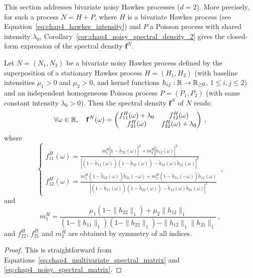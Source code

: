       This section addresses bivariate noisy Hawkes processes ($d=2$).
      More precisely, for such a process $N = H + P$, where $H$ is a bivariate Hawkes process (see Equation~\eqref{eq:chap4_hawkes_intensity}) and $P$ a Poisson process with shared intensity $\lambda_0$,
      Corollary~\ref{cor:chap4_noisy_spectral_density_2} gives the closed-form expression of the spectral density $\mathbf f^N$.
      \begin{corollary}\label{cor:chap4_noisy_spectral_density_2}
        Let $N = (N_1, N_2)$ be a bivariate noisy Hawkes process defined by the superposition of a stationary Hawkes process $H = (H_1, H_2)$
        (with baseline intensities $\mu_1 > 0$ and $\mu_2 > 0$, and kernel functions $h_{ij} : {\mathbb R} \to {\mathbb R}_{\geq 0}$, $1 \le i, j \le 2$)
        and an independent homogeneous Poisson process $P = (P_1, P_2)$ (with same constant intensity $\lambda_0 > 0$).
        Then the spectral density $\mathbf f^N$ of $N$ reads:
        \begin{equation*}
          \forall \omega \in {\mathbb R}, \quad
          \mathbf f^N(\omega) =
          \begin{pmatrix}
            f_{11}^H(\omega) + \lambda_0 & f_{12}^H(\omega) \\
            f_{21}^H(\omega) & f_{22}^H(\omega) + \lambda_0
          \end{pmatrix} \,,
        \end{equation*}
        where
        \[
          \begin{cases}
            f_{11}^H (\omega) = \frac{m_1^H \left \lvert 1 - \tilde h_{22}(\omega) \right \rvert^2 + m_2^H \left \lvert  \tilde h_{12}(\omega) \right \rvert^2}{\left \lvert \left (1-\tilde h_{11}(\omega) \right) \left (1-\tilde h_{22}(\omega) \right) - \tilde h_{12}(\omega) \tilde h_{21}(\omega) \right \rvert^2}\\
            f_{12}^H(\omega) = \frac{m_1^H \left(1-\tilde h_{22}(\omega) \right)\tilde h_{21}(-\omega) + m_2^H \left (1-\tilde h_{11}(-\omega) \right) \tilde h_{12}(\omega)}{\left \lvert \left (1-\tilde h_{11}(\omega) \right) \left (1-\tilde h_{22}(\omega) \right) - \tilde h_{12}(\omega) \tilde h_{21}(\omega) \right \rvert^2}
          \end{cases} \,,
        \]
        and
        \[
          m_1^H = \frac{\mu_1\left( 1 - \|h_{22}\|_1 \right)  + \mu_2 \|h_{12}\|_1 }{\left( 1 - \|h_{11}\|_1 \right)\left( 1 - \|h_{22}\|_1 \right) - \|h_{12}\|_1 \|h_{21}\|_1} \, ,
        \]
        and $f_{22}^H$, $f_{21}^H$ and $m_2^H$ are obtained by symmetry of all indices.
      \end{corollary}
      \begin{proof}
        This is straightforward from Equations~\eqref{eq:chap4_multivariate_spectral_matrix} and \eqref{eq:chap4_noisy_spectral_matrix}.
      \end{proof}
      

